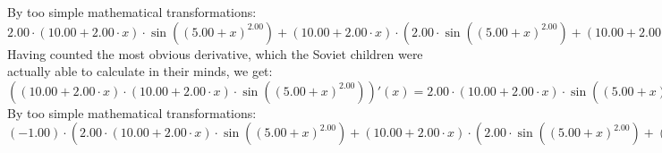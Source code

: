 \documentclass{article}
\begin{document}
\newline
By too simple mathematical transformations:
 ${{{2.00} \cdot {\left({{10.00} + {{2.00} \cdot {x}}}\right) \cdot  \sin {\left({\left({{5.00} + {x}}\right) ^ {2.00}}\right)} }} + {\left({{10.00} + {{2.00} \cdot {x}}}\right) \cdot \left({{{2.00} \cdot  \sin {\left({\left({{5.00} + {x}}\right) ^ {2.00}}\right)} } + {\left({{10.00} + {{2.00} \cdot {x}}}\right) \cdot { \cos {\left({\left({{5.00} + {x}}\right) ^ {2.00}}\right)}  \cdot \left({{10.00} + {{2.00} \cdot {x}}}\right)}}}\right)}} = {{{2.00} \cdot {\left({{10.00} + {{2.00} \cdot {x}}}\right) \cdot  \sin {\left({\left({{5.00} + {x}}\right) ^ {2.00}}\right)} }} + {\left({{10.00} + {{2.00} \cdot {x}}}\right) \cdot \left({{{2.00} \cdot  \sin {\left({\left({{5.00} + {x}}\right) ^ {2.00}}\right)} } + {\left({{10.00} + {{2.00} \cdot {x}}}\right) \cdot { \cos {\left({\left({{5.00} + {x}}\right) ^ {2.00}}\right)}  \cdot \left({{10.00} + {{2.00} \cdot {x}}}\right)}}}\right)}}$ 
 \newline
 \newline 
Having counted the most obvious derivative, which the Soviet children were actually able to calculate in their minds, we get:
$({\left({{10.00} + {{2.00} \cdot {x}}}\right) \cdot {\left({{10.00} + {{2.00} \cdot {x}}}\right) \cdot  \sin {\left({\left({{5.00} + {x}}\right) ^ {2.00}}\right)} }})'(x) = {{{2.00} \cdot {\left({{10.00} + {{2.00} \cdot {x}}}\right) \cdot  \sin {\left({\left({{5.00} + {x}}\right) ^ {2.00}}\right)} }} + {\left({{10.00} + {{2.00} \cdot {x}}}\right) \cdot \left({{{2.00} \cdot  \sin {\left({\left({{5.00} + {x}}\right) ^ {2.00}}\right)} } + {\left({{10.00} + {{2.00} \cdot {x}}}\right) \cdot { \cos {\left({\left({{5.00} + {x}}\right) ^ {2.00}}\right)}  \cdot \left({{10.00} + {{2.00} \cdot {x}}}\right)}}}\right)}}$\newline
\newline
By too simple mathematical transformations:
 ${\left({-1.00}\right) \cdot \left({{{2.00} \cdot {\left({{10.00} + {{2.00} \cdot {x}}}\right) \cdot  \sin {\left({\left({{5.00} + {x}}\right) ^ {2.00}}\right)} }} + {\left({{10.00} + {{2.00} \cdot {x}}}\right) \cdot \left({{{2.00} \cdot  \sin {\left({\left({{5.00} + {x}}\right) ^ {2.00}}\right)} } + {\left({{10.00} + {{2.00} \cdot {x}}}\right) \cdot { \cos {\left({\left({{5.00} + {x}}\right) ^ {2.00}}\right)}  \cdot \left({{10.00} + {{2.00} \cdot {x}}}\right)}}}\right)}}\right)} = {{\left({-2.00}\right) \cdot {\left({{10.00} + {{2.00} \cdot {x}}}\right) \cdot  \sin {\left({\left({{5.00} + {x}}\right) ^ {2.00}}\right)} }} - {\left({{10.00} + {{2.00} \cdot {x}}}\right) \cdot \left({{{2.00} \cdot  \sin {\left({\left({{5.00} + {x}}\right) ^ {2.00}}\right)} } + {\left({{10.00} + {{2.00} \cdot {x}}}\right) \cdot { \cos {\left({\left({{5.00} + {x}}\right) ^ {2.00}}\right)}  \cdot \left({{10.00} + {{2.00} \cdot {x}}}\right)}}}\right)}}$ 
\end{document}
